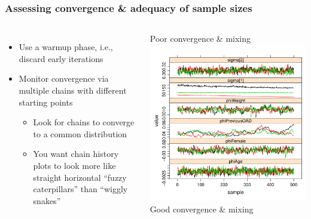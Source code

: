 \documentclass{beamer}
\begin{document}
\begin{frame}
  \frametitle{Assessing convergence \& adequacy of sample sizes}
  
\begin{columns}
\begin{itemize}
\item Use a warmup phase, i.e., discard early iterations
\item Monitor convergence via multiple chains with different starting points
\begin{itemize}
\item Look for chains to converge to a common distribution
\item You want chain history plots to look more like straight horizontal “fuzzy caterpillars” than “wiggly snakes”
\end{itemize}
\end{itemize}
\center
\vspace{-16pt}
Poor convergence \& mixing\\
\includegraphics[width=\textwidth,height=0.4\textheight]{graphics/poorConvergence.pdf}\\
\vspace{-8pt}
Good convergence \& mixing\\

\end{columns}
\end{frame}
\end{document}
